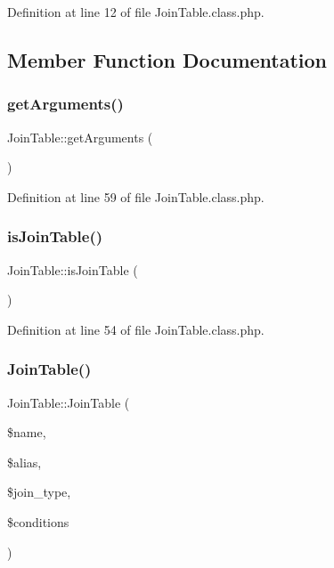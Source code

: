 Definition at line 12 of file Join\+Table.\+class.\+php.



\subsection{Member Function Documentation}
\hypertarget{classJoinTable_a2f8aae7c1c5d0879f1085b9280018b4e}{}\label{classJoinTable_a2f8aae7c1c5d0879f1085b9280018b4e} 
\subsubsection{\texorpdfstring{get\+Arguments()}{getArguments()}}
{\footnotesize\ttfamily Join\+Table\+::get\+Arguments (\begin{DoxyParamCaption}{ }\end{DoxyParamCaption})}



Definition at line 59 of file Join\+Table.\+class.\+php.

\hypertarget{classJoinTable_aa26630df96bb0dac2ddcccff34c91530}{}\label{classJoinTable_aa26630df96bb0dac2ddcccff34c91530} 
\subsubsection{\texorpdfstring{is\+Join\+Table()}{isJoinTable()}}
{\footnotesize\ttfamily Join\+Table\+::is\+Join\+Table (\begin{DoxyParamCaption}{ }\end{DoxyParamCaption})}



Definition at line 54 of file Join\+Table.\+class.\+php.

\hypertarget{classJoinTable_a70859ad638b9149e97b8209d4f73610e}{}\label{classJoinTable_a70859ad638b9149e97b8209d4f73610e} 
\subsubsection{\texorpdfstring{Join\+Table()}{JoinTable()}}
{\footnotesize\ttfamily Join\+Table\+::\+Join\+Table (\begin{DoxyParamCaption}\item[{}]{\$name,  }\item[{}]{\$alias,  }\item[{}]{\$join\+\_\+type,  }\item[{}]{\$conditions }\end{DoxyParamCaption})}

